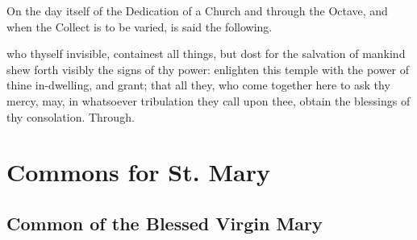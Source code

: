 \begin{rubric}
	On the day itself of the Dedication of a Church and through the Octave, and when the Collect is to be varied, is said the following.
\end{rubric}
 who thyself invisible, containest all things, but dost for the salvation of mankind shew forth visibly the signs of thy power: enlighten this temple with the power of thine in-dwelling, and grant; that all they, who come together here to ask thy mercy, may, in whatsoever tribulation they call upon thee, obtain the blessings of thy consolation. Through.


\clearpage
\section{Commons for St. Mary}

\subsection{Common of the Blessed Virgin Mary}\label{CommonBVM}

